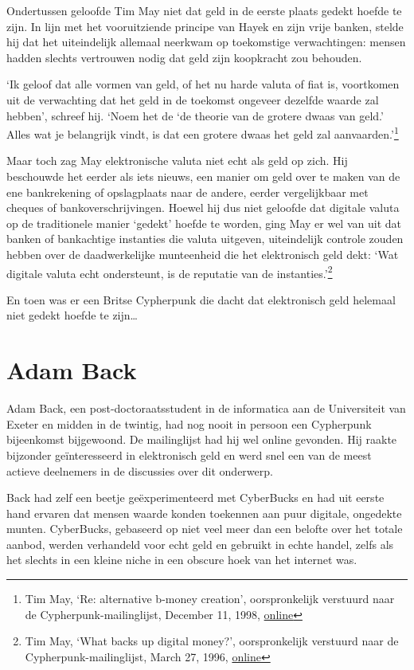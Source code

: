 \documentclass[
  a5paper,
  smalldemyvopaper,11pt,twoside,onecolumn,openright,extrafontsizes,
hidelinks]{memoir}
\begin{document}
Ondertussen geloofde Tim May niet dat geld in de eerste plaats gedekt
hoefde te zijn. In lijn met het vooruitziende principe van Hayek en zijn
vrije banken, stelde hij dat het uiteindelijk allemaal neerkwam op
toekomstige verwachtingen: mensen hadden slechts vertrouwen nodig dat
geld zijn koopkracht zou behouden.

`Ik geloof dat alle vormen van geld, of het nu harde valuta of fiat is,
voortkomen uit de verwachting dat het geld in de toekomst ongeveer
dezelfde waarde zal hebben', schreef hij. `Noem het de `de theorie van
de grotere dwaas van geld.' Alles wat je belangrijk vindt, is dat een
grotere dwaas het geld zal aanvaarden.'\footnote{Tim May, `Re:
  alternative b-money creation', oorspronkelijk verstuurd naar de
  Cypherpunk-mailinglijst, December 11, 1998,
  \href{https://cypherpunks.venona.com/date/1998/12/msg00455.html}{online}}

Maar toch zag May elektronische valuta niet echt als geld op zich. Hij
beschouwde het eerder als iets nieuws, een manier om geld over te maken
van de ene bankrekening of opslagplaats naar de andere, eerder
vergelijkbaar met cheques of bankoverschrijvingen. Hoewel hij dus niet
geloofde dat digitale valuta op de traditionele manier `gedekt' hoefde
te worden, ging May er wel van uit dat banken of bankachtige instanties
die valuta uitgeven, uiteindelijk controle zouden hebben over de
daadwerkelijke munteenheid die het elektronisch geld dekt: `Wat digitale
valuta echt ondersteunt, is de reputatie van de instanties.'\footnote{Tim
  May, `What backs up digital money?', oorspronkelijk verstuurd naar de
  Cypherpunk-mailinglijst, March 27, 1996,
  \href{https://cypherpunks.venona.com/date/1996/03/msg01576.html}{online}}

En toen was er een Britse Cypherpunk die dacht dat elektronisch geld
helemaal niet gedekt hoefde te zijn\ldots{}

\section{Adam Back}\label{adam-back}

Adam Back, een post-doctoraatsstudent in de informatica aan de
Universiteit van Exeter en midden in de twintig, had nog nooit in
persoon een Cypherpunk bijeenkomst bijgewoond. De mailinglijst had hij
wel online gevonden. Hij raakte bijzonder geïnteresseerd in elektronisch
geld en werd snel een van de meest actieve deelnemers in de discussies
over dit onderwerp.

Back had zelf een beetje geëxperimenteerd met CyberBucks en had uit
eerste hand ervaren dat mensen waarde konden toekennen aan puur
digitale, ongedekte munten. CyberBucks, gebaseerd op niet veel meer dan
een belofte over het totale aanbod, werden verhandeld voor echt geld en
gebruikt in echte handel, zelfs als het slechts in een kleine niche in
een obscure hoek van het internet was.
\end{document}
